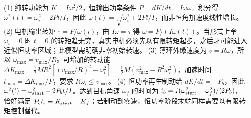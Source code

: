 (1) 纯转动能为 \(K=I\omega^2/2\)，恒输出功率条件 \(P=dK/dt=I\omega\dot\omega\)。积分得 \(\omega^2(t)=\omega_i^2+2Pt/I\)，因此 \(\omega(t)=\sqrt{\omega_i^2+2Pt/I}\)，而非恒角加速度线性增长。
(2) 电机输出转矩 \(\tau=P/\omega(t)\)，由 \(I\dot\omega=\tau\) 得 \(\dot\omega=P/(I\omega(t))\)。当形式上令 \(\omega_i=0\) 时 \(t=0\) 的转矩趋无穷，真实电机必须先以有限转矩起步，之后才可能进入近似恒功率区域；此模型需明确非零初始转速。
(3) 薄环外缘速度为 \(v=R\omega\)，所以 \(\omega_{\max}=v_{\max}/R\)。可增加的转动能 \(\Delta K_{\max}=\tfrac12MR^2[(v_{\max}/R)^2-\omega_i^2]=\tfrac12M(v_{\max}^2-R^2\omega_i^2)\)，加速时间 \(t_{\max}=\Delta K_{\max}/P\)，要求 \(R\omega_i\le v_{\max}\)。
(4) 恒功率再生制动给 \(dK/dt=-P_b\)，因此 \(\omega^2(t)=\omega_{\rm start}^2-2P_bt/I\)。达到目标角速 \(\omega_f\) 的时间为 \(t_b=I(\omega_{\rm start}^2-\omega_f^2)/(2P_b)\)，恰好满足 \(P_bt_b=K_{\rm start}-K_f\)；若制动到零速，恒功率阶段末端同样需要以有限转矩控制替代。
